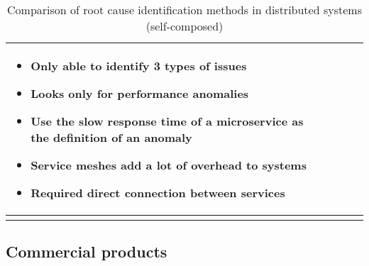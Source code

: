 \begin{longtable}{| p{20mm} | p{43mm} | p{43mm} | p{43mm} |}
\begin{itemize}[leftmargin=*,noitemsep,nolistsep]
    \item Only able to identify 3 types of issues
    \item Looks only for performance anomalies
    \item Use the slow response time of a microservice as the definition of an anomaly
    \item Service meshes add a lot of overhead to systems
    \item Required direct connection between services
  \vspace{-7mm}
  \end{itemize} \\ \hline
  \caption{Comparison of root cause identification methods in distributed systems (self-composed)}
\end{longtable}

\subsection{Commercial products}

